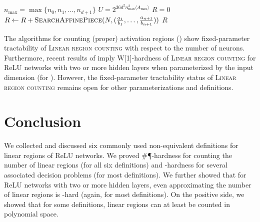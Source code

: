 \documentclass{article}
\begin{document}
\begin{algorithm}
\caption{\textsc{SearchAffinePiece}}
\label{alg:search_affine_piece}
    \begin{algorithmic}[1]
         
        \EndIf
        \EndIf
        \EndFor
    \end{algorithmic}
\end{algorithm}
\begin{algorithm}
\caption{\textsc{ExhaustiveSearch}}
\label{alg:exhaustive_search}
    \begin{algorithmic}[1]
        \State $n_{\max}=\max\{n_0,n_1,\dots, n_{d+1}\}$
        \State $U=2^{36d^2n_{\max}^2\langle A_{\max}\rangle}$ 
        \State $R=0$
        \State $R \leftarrow R+\textsc{SearchAffinePiece}(N,(\frac{a_1}{b_1},\dots, \frac{a_{n+1}}{b_{n+1}}))$ 
        \EndIf
        \EndFor
        \Return $R$
    \end{algorithmic}
\end{algorithm}

The algorithms for counting (proper) activation regions () show fixed-parameter tractability of \textsc{Linear region counting} with respect to the number of neurons.
Furthermore, recent results of \citet[Corollary 4.4]{froese2025parameterized} imply W[1]-hardness of \textsc{Linear region counting} for ReLU networks with two or more hidden layers when parameterized by the input dimension (for ).
However, the fixed-parameter tractability status of \textsc{Linear region counting} remains open for other parameterizations and definitions.

\section{Conclusion}
We collected and discussed six commonly used non-equivalent definitions for linear regions of ReLU networks.
We proved \#\P-hardness for counting the number of linear regions (for all six definitions) and \NP-hardness for several associated decision problems (for most definitions).
We further showed that for ReLU networks with two or more hidden layers, even approximating the number of linear regions is \NP-hard (again, for most definitions).
On the positive side, we showed that for some definitions, linear regions can at least be counted in polynomial space.
\end{document}
